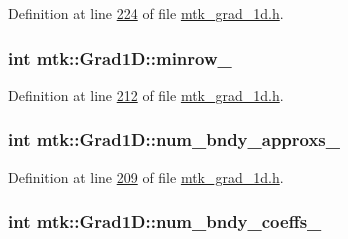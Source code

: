 Definition at line \hyperlink{mtk__grad__1d_8h_source_l00224}{224} of file \hyperlink{mtk__grad__1d_8h_source}{mtk\+\_\+grad\+\_\+1d.\+h}.

\hypertarget{classmtk_1_1Grad1D_a27b8a20e163ad803546592cc3736c12a}{
\subsubsection[{minrow\+\_\+}]{\setlength{\rightskip}{0pt plus 5cm}int mtk\+::\+Grad1\+D\+::minrow\+\_\+\hspace{0.3cm}{\ttfamily [private]}}}\label{classmtk_1_1Grad1D_a27b8a20e163ad803546592cc3736c12a}


Definition at line \hyperlink{mtk__grad__1d_8h_source_l00212}{212} of file \hyperlink{mtk__grad__1d_8h_source}{mtk\+\_\+grad\+\_\+1d.\+h}.

\hypertarget{classmtk_1_1Grad1D_abe15c1ffd9dfaba1a65f4f0e096287ce}{
\subsubsection[{num\+\_\+bndy\+\_\+approxs\+\_\+}]{\setlength{\rightskip}{0pt plus 5cm}int mtk\+::\+Grad1\+D\+::num\+\_\+bndy\+\_\+approxs\+\_\+\hspace{0.3cm}{\ttfamily [private]}}}\label{classmtk_1_1Grad1D_abe15c1ffd9dfaba1a65f4f0e096287ce}


Definition at line \hyperlink{mtk__grad__1d_8h_source_l00209}{209} of file \hyperlink{mtk__grad__1d_8h_source}{mtk\+\_\+grad\+\_\+1d.\+h}.

\hypertarget{classmtk_1_1Grad1D_a60c560882bc601f9ab1d4cd5331e55ef}{
\subsubsection[{num\+\_\+bndy\+\_\+coeffs\+\_\+}]{\setlength{\rightskip}{0pt plus 5cm}int mtk\+::\+Grad1\+D\+::num\+\_\+bndy\+\_\+coeffs\+\_\+\hspace{0.3cm}{\ttfamily [private]}}}\label{classmtk_1_1Grad1D_a60c560882bc601f9ab1d4cd5331e55ef}


